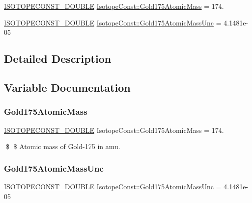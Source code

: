 \begin{DoxyCompactItemize}
\item 
\mbox{\hyperlink{group___isotope_const-_macros_ga8f45a7272ce02c0b4c65c44636ed719a}{I\+S\+O\+T\+O\+P\+E\+C\+O\+N\+S\+T\+\_\+\+D\+O\+U\+B\+LE}} \mbox{\hyperlink{group___isotope_const-_gold-_au175_ga6105f11d804f87d0522b351bd41af2d6}{Isotope\+Const\+::\+Gold175\+Atomic\+Mass}} = 174.
\item 
\mbox{\hyperlink{group___isotope_const-_macros_ga8f45a7272ce02c0b4c65c44636ed719a}{I\+S\+O\+T\+O\+P\+E\+C\+O\+N\+S\+T\+\_\+\+D\+O\+U\+B\+LE}} \mbox{\hyperlink{group___isotope_const-_gold-_au175_ga3ba895a3f7d9c2807f27cc0196ee7007}{Isotope\+Const\+::\+Gold175\+Atomic\+Mass\+Unc}} = 4.\+1481e-\/05
\end{DoxyCompactItemize}


\subsection{Detailed Description}


\subsection{Variable Documentation}
\mbox{\label{group___isotope_const-_gold-_au175_ga6105f11d804f87d0522b351bd41af2d6}} 
\subsubsection{\texorpdfstring{Gold175\+Atomic\+Mass}{Gold175AtomicMass}}
{\footnotesize\ttfamily \mbox{\hyperlink{group___isotope_const-_macros_ga8f45a7272ce02c0b4c65c44636ed719a}{I\+S\+O\+T\+O\+P\+E\+C\+O\+N\+S\+T\+\_\+\+D\+O\+U\+B\+LE}} Isotope\+Const\+::\+Gold175\+Atomic\+Mass = 174.}

\$ \$ Atomic mass of Gold-\/175 in amu. \mbox{\label{group___isotope_const-_gold-_au175_ga3ba895a3f7d9c2807f27cc0196ee7007}} 
\subsubsection{\texorpdfstring{Gold175\+Atomic\+Mass\+Unc}{Gold175AtomicMassUnc}}
{\footnotesize\ttfamily \mbox{\hyperlink{group___isotope_const-_macros_ga8f45a7272ce02c0b4c65c44636ed719a}{I\+S\+O\+T\+O\+P\+E\+C\+O\+N\+S\+T\+\_\+\+D\+O\+U\+B\+LE}} Isotope\+Const\+::\+Gold175\+Atomic\+Mass\+Unc = 4.\+1481e-\/05}

